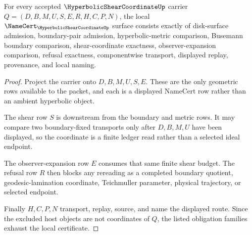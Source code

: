 \begin{theorem}
\label{thm:hyperbolic-shear-coordinate-namecert-obligations}
For every accepted $\HyperbolicShearCoordinateUp$ carrier $Q=(D,B,M,U,S,E,R,H,C,P,N)$, the local $\NameCert_{\HyperbolicShearCoordinateUp}$ surface consists exactly of disk-surface admission, boundary-pair admission, hyperbolic-metric comparison, Busemann boundary comparison, shear-coordinate exactness, observer-expansion comparison, refusal exactness, componentwise transport, displayed replay, provenance, and local naming.
\end{theorem}
\begin{proof}
Project the carrier onto $D,B,M,U,S,E$. These are the only geometric rows available to the packet, and each is a displayed NameCert row rather than an ambient hyperbolic object.

The shear row $S$ is downstream from the boundary and metric rows. It may compare two boundary-fixed transports only after $D,B,M,U$ have been displayed, so the coordinate is a finite ledger read rather than a selected ideal endpoint.

The observer-expansion row $E$ consumes that same finite shear budget. The refusal row $R$ then blocks any rereading as a completed boundary quotient, geodesic-lamination coordinate, Teichmuller parameter, physical trajectory, or selected endpoint.

Finally $H,C,P,N$ transport, replay, source, and name the displayed route. Since the excluded host objects are not coordinates of $Q$, the listed obligation families exhaust the local certificate.
\end{proof}

